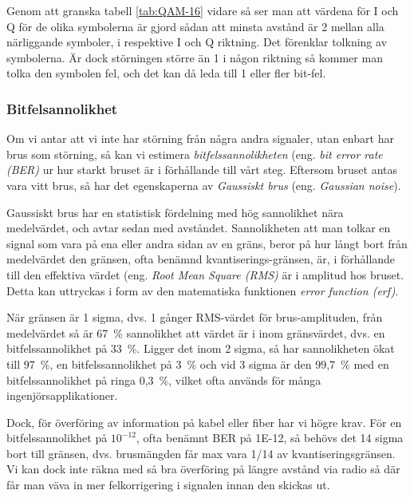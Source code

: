 Genom att granska tabell \ref{tab:QAM-16} vidare så ser man att värdena för
I och Q för de olika symbolerna är gjord sådan att minsta avstånd är 2 mellan
alla närliggande symboler, i respektive I och Q riktning. Det förenklar
tolkning av symbolerna. Är dock störningen större än 1 i någon riktning så
kommer man tolka den symbolen fel, och det kan då leda till 1 eller fler
bit-fel.

\subsubsection{Bitfelsannolikhet}

Om vi antar att vi inte har störning från några andra signaler, utan enbart har
brus som störning, så kan vi estimera \emph{bitfelssannolikheten} (eng.
\emph{bit error rate (BER)} ur hur starkt bruset är i förhållande till vårt
steg. Eftersom bruset antas vara vitt brus, så har det egenskaperna av
\emph{Gaussiskt brus} (eng. \emph{Gaussian noise}).

Gaussiskt brus har en statistisk fördelning med hög sannolikhet nära
medelvärdet, och avtar sedan med avståndet. Sannolikheten att man tolkar en
signal som vara på ena eller andra sidan av en gräns, beror på hur långt bort
från medelvärdet den gränsen, ofta benämnd kvantiserings-gränsen, är, i
förhållande till den effektiva värdet (eng. \emph{Root Mean Square (RMS)} är i
amplitud hos bruset. Detta kan uttryckas i form av den matematiska funktionen
\emph{error function (erf)}.

När gränsen är 1 sigma, dvs. 1 gånger RMS-värdet för brus-amplituden, från
medelvärdet så är 67~\% sannolikhet att värdet är i inom gränsvärdet, dvs. en
bitfelssannolikhet på 33~\%.
Ligger det inom 2 sigma, så har sannolikheten ökat till 97~\%, en
bitfelssannolikhet på 3~\% och vid 3 sigma är den 99,7~\% med en
bitfelssannolikhet på ringa 0,3~\%, vilket ofta används för många
ingenjörsapplikationer. 

Dock, för överföring av information på kabel eller fiber har vi högre krav.
För en bitfelssannolikhet på \(10^{-12}\), ofta benämnt BER på 1E-12, så
behövs det 14 sigma bort till gränsen, dvs. brusmängden får max vara 1/14 av
kvantiseringsgränsen. Vi kan dock inte räkna med så bra överföring på längre avstånd via radio så där får man väva in mer felkorrigering i signalen innan den skickas ut.


